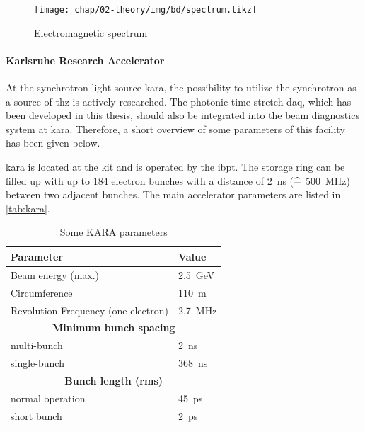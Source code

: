 \begin{figure}[tb]
	\centering
	\texttt{[image: chap/02-theory/img/bd/spectrum.tikz]}
	\caption{Electromagnetic spectrum} %
	\label{fig:spectrum}
\end{figure}


\paragraph{Karlsruhe Research Accelerator}
At the synchrotron light source \gls{kara}, the possibility to utilize the synchrotron as a source of \gls{thz} is actively researched. 
The photonic time-stretch \gls{daq}, which has been developed in this thesis, should also be integrated into the beam diagnostics system at \gls{kara}. 
Therefore, a short overview of some parameters of this facility has been given below.

\gls{kara} is located at the \gls{kit} and is operated by the \gls{ibpt}.
The storage ring can be filled up with up to 184 electron bunches with a distance of \SI{2}{\nano\second} ($\mathrel{\widehat{=}}$ \SI{500}{\mega\hertz}) between two adjacent bunches.
The main accelerator parameters are listed in \autoref{tab:kara}. 

\begin{table}[tb]
	\caption{Some KARA parameters \cite{rota2018}}
	\label{tab:kara}
	\centering
	\begin{tabular}{ll}
		\toprule
		\textbf{Parameter}                  & \textbf{Value}                \\ \midrule
		Beam energy (max.)                  & \SI{2.5}{\giga \electronvolt} \\
		Circumference                       & \SI{110}{\meter}              \\
		Revolution Frequency (one electron) & \SI{2.7}{\mega \hertz}        \\
		\multicolumn{2}{c}{\textbf{Minimum bunch spacing}}          \\
		\quad multi-bunch                   & \SI{2}{\nano \second}         \\
		\quad single-bunch                  & \SI{368}{\nano \second}       \\
		\multicolumn{2}{c}{\textbf{Bunch length (rms)}}           \\
		\quad normal operation              & \SI{45}{\pico \second}        \\
		\quad short bunch                   & \SI{2}{\pico \second}         \\ \bottomrule
	\end{tabular}
\end{table}

